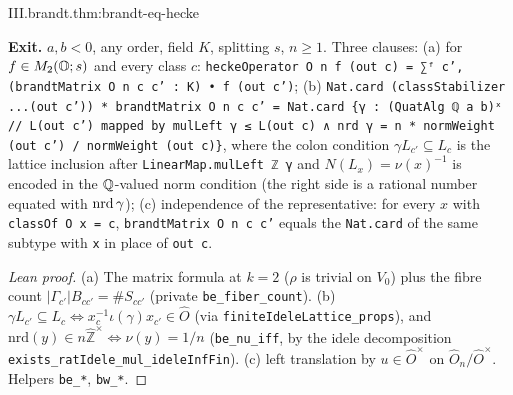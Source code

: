 \begin{tfformal}{III.brandt.thm:brandt-eq-hecke}
\begin{tffidelity}
\textbf{Exit.} $a,b<0$, any order, field $K$, splitting $s$, $n\ge1$. Three clauses: (a) for $f\in M_2(\mathbb{O};s)$ and every class $c$: \texttt{heckeOperator O n f (out c) = ∑ᶠ c', (brandtMatrix O n c c' : K) • f (out c')}; (b) \texttt{Nat.card (classStabilizer ...(out c')) * brandtMatrix O n c c' = Nat.card \{γ : (QuatAlg ℚ a b)ˣ // L(out c') mapped by mulLeft γ ≤ L(out c) ∧ nrd γ = n * normWeight (out c') / normWeight (out c)\}}, where the colon condition $\gamma L_{c'}\subseteq L_c$ is the lattice inclusion after \texttt{LinearMap.mulLeft ℤ γ} and $N(L_x)=\nu(x)^{-1}$ is encoded in the $\mathbb{Q}$-valued norm condition (the right side is a rational number equated with $\operatorname{nrd}\gamma$); (c) independence of the representative: for every $x$ with \texttt{classOf O x = c}, \texttt{brandtMatrix O n c c'} equals the \texttt{Nat.card} of the same subtype with \texttt{x} in place of \texttt{out c}.
\end{tffidelity}
\end{tfformal}
\begin{proof}[Lean proof]
(a) The matrix formula at $k=2$ ($\rho$ is trivial on $V_0$) plus the fibre count $|\Gamma_{c'}|B_{cc'}=\#S_{cc'}$ (private \texttt{be\_fiber\_count}). (b) $\gamma L_{c'}\subseteq L_c\iff x_c^{-1}\iota(\gamma)x_{c'}\in\hat O$ (via \texttt{finiteIdeleLattice\_props}), and $\mathrm{nrd}(y)\in n\widehat{\mathbb Z}^\times\iff\nu(y)=1/n$ (\texttt{be\_nu\_iff}, by the idele decomposition \texttt{exists\_ratIdele\_mul\_ideleInfFin}). (c) left translation by $u\in\hat O^\times$ on $\hat O_n/\hat O^\times$. Helpers \texttt{be\_*}, \texttt{bw\_*}.
\end{proof}

